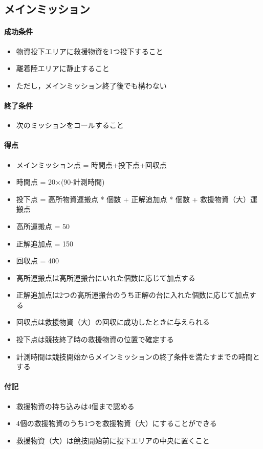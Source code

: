 
\subsection{メインミッション}
\paragraph{成功条件}
\begin{itemize}
\item 物資投下エリアに救援物資を1つ投下すること
\item 離着陸エリアに静止すること
  \item ただし，メインミッション終了後でも構わない
\end{itemize}
\paragraph{終了条件}
\begin{itemize}
\item 次のミッションをコールすること
\end{itemize}
\paragraph{得点}
\begin{itemize}
\item メインミッション点 = 時間点+投下点+回収点
\item 時間点 = 20×(90-計測時間)
\item 投下点 = 高所物資運搬点 * 個数 + 正解追加点 * 個数 + 救援物資（大）運搬点
\item 高所運搬点 = 50
\item 正解追加点 = 150
\item 回収点 = 400
\item 高所運搬点は高所運搬台にいれた個数に応じて加点する
\item 正解追加点は2つの高所運搬台のうち正解の台に入れた個数に応じて加点する
\item 回収点は救援物資（大）の回収に成功したときに与えられる
\item 投下点は競技終了時の救援物資の位置で確定する
\item 計測時間は競技開始からメインミッションの終了条件を満たすまでの時間とする
\end{itemize}
\paragraph{付記}
\begin{itemize}
\item 救援物資の持ち込みは4個まで認める
\item 4個の救援物資のうち1つを救援物資（大）にすることができる
\item 救援物資（大）は競技開始前に投下エリアの中央に置くこと
\end{itemize}

